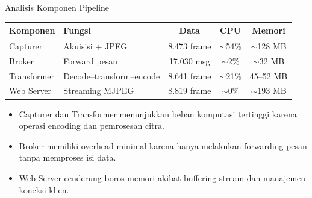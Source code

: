 \documentclass[aspectratio=169, table]{beamer}
\begin{document}
\begin{frame}{Analisis Komponen Pipeline}
	\vspace{20pt}
	\centering
	\setlength{\arrayrulewidth}{0.8pt}
	\begin{tabular}{|l|l|c|c|c|}
	\hline
	\textbf{Komponen} & \textbf{Fungsi} & \textbf{Data} & \textbf{CPU} & \textbf{Memori} \\
	\hline
	Capturer & Akuisisi + JPEG & 8.473 frame & $\sim$54\% & $\sim$128 MB \\
	\hline
	Broker & Forward pesan & 17.030 msg & $\sim$2\% & $\sim$32 MB \\
	\hline
	Transformer & Decode--transform--encode & 8.641 frame & $\sim$21\% & 45--52 MB \\
	\hline
	Web Server & Streaming MJPEG & 8.819 frame & $\sim$0\% & $\sim$193 MB \\
	\hline
	\end{tabular}
	
	\vspace{6pt}
	\begin{itemize}
		\item Capturer dan Transformer menunjukkan beban komputasi tertinggi karena operasi encoding dan pemrosesan citra.
		\item Broker memiliki overhead minimal karena hanya melakukan forwarding pesan tanpa memproses isi data.
		\item Web Server cenderung boros memori akibat buffering stream dan manajemen koneksi klien.
	\end{itemize}
\end{frame}
\end{document}
